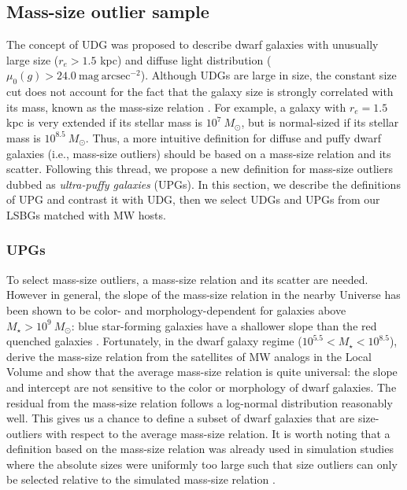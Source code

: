 \documentclass[twocolumn,astrosymb,twocolappendix]{aastex631}
\newcommand{\sbunit}{\mathrm{mag\ arcsec}^{-2}}
\newcommand{\sbcen}{\mu_{0}(g)}
\begin{document}
\begin{CJK*}{UTF8}{gbsn}
\subsection{Mass-size outlier sample}\label{sec:sample}
The concept of UDG was proposed to describe dwarf galaxies with unusually large size ($r_e>1.5$ kpc) and diffuse light distribution ($\sbcen > 24.0\ \sbunit$). Although UDGs are large in size, the constant size cut does not account for the fact that the galaxy size is strongly correlated with its mass, known as the mass-size relation \citep[e.g.,][]{Graham2003,Trujillo2007,vanDokkum2013,Cappellari2013,Lange2015}. For example, a galaxy with $r_e = 1.5$ kpc is very extended if its stellar mass is $10^7\ M_\odot$, but is normal-sized if its stellar mass is $10^{8.5}\ M_\odot$.
Thus, a more intuitive definition for diffuse and puffy dwarf galaxies (i.e., mass-size outliers) should be based on a mass-size relation and its scatter. Following this thread, we propose a new definition for mass-size outliers dubbed as \textit{ultra-puffy galaxies} (UPGs). In this section, we describe the definitions of UPG and contrast it with UDG, then we select UDGs and UPGs from our LSBGs matched with MW hosts. 

\subsubsection{UPGs}
To select mass-size outliers, a mass-size relation and its scatter are needed. However in general, the slope of the mass-size relation in the nearby Universe has been shown to be color- and morphology-dependent for galaxies above $M_\star > 10^{9}\ M_\odot$: blue star-forming galaxies have a shallower slope than the red quenched galaxies \citep[e.g.,][]{Lange2015}. Fortunately, in the dwarf galaxy regime ($10^{5.5} < M_\star < 10^{8.5}$), \citet{ELVES-I} derive the mass-size relation from the satellites of MW analogs in the Local Volume and show that the average mass-size relation is quite universal: the slope and intercept are not sensitive to the color or morphology of dwarf galaxies. The residual from the mass-size relation follows a log-normal distribution reasonably well. This gives us a chance to define a subset of dwarf galaxies that are size-outliers with respect to the average mass-size relation. It is worth noting that a definition based on the mass-size relation was already used in simulation studies where the absolute sizes were uniformly too large such that size outliers can only be selected relative to the simulated mass-size relation \citep[e.g.,][]{Benavides2021,Benavides2022}. 


\end{CJK*}
\end{document}
